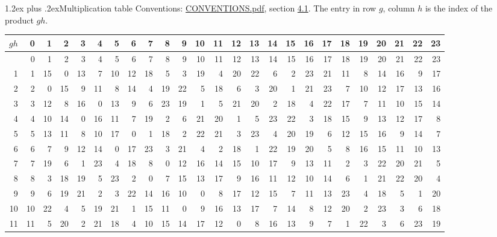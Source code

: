 \documentclass[10pt,a4paper]{article}
\makeatletter
\renewcommand\section{\@startsection{section}{1}{\z@}{-3ex plus -1ex minus -.2ex}%
  {1.2ex plus .2ex}{\normalfont\large\sffamily\bfseries\color{parttitle}}}
\numberwithin{equation}{section}
\makeatother
\begin{document}
\section{Multiplication table}\label{s:multiplication}
Conventions: \href{../../CONVENTIONS.pdf}{CONVENTIONS.pdf}, section \href{../../CONVENTIONS.pdf\#conv.4.1}{4.1}.
The entry in row $g$, column $h$ is the index of the product $gh$.
{\normalsize\setlength{\tabcolsep}{0.1em}\setlength{\LTleft}{-8pt plus 1fill}\setlength{\LTright}{-8pt plus 1fill}\begin{longtable}{@{}r|rrrrrrrrrrrrrrrrrrrrrrrr@{}}\toprule
$gh$ & 0 & 1 & 2 & 3 & 4 & 5 & 6 & 7 & 8 & 9 & 10 & 11 & 12 & 13 & 14 & 15 & 16 & 17 & 18 & 19 & 20 & 21 & 22 & 23\\\midrule\endhead
\bottomrule\endfoot\endlastfoot
0 & 0 & 1 & 2 & 3 & 4 & 5 & 6 & 7 & 8 & 9 & 10 & 11 & 12 & 13 & 14 & 15 & 16 & 17 & 18 & 19 & 20 & 21 & 22 & 23\\*
1 & 1 & 15 & 0 & 13 & 7 & 10 & 12 & 18 & 5 & 3 & 19 & 4 & 20 & 22 & 6 & 2 & 23 & 21 & 11 & 8 & 14 & 16 & 9 & 17\\
2 & 2 & 0 & 15 & 9 & 11 & 8 & 14 & 4 & 19 & 22 & 5 & 18 & 6 & 3 & 20 & 1 & 21 & 23 & 7 & 10 & 12 & 17 & 13 & 16\\
3 & 3 & 12 & 8 & 16 & 0 & 13 & 9 & 6 & 23 & 19 & 1 & 5 & 21 & 20 & 2 & 18 & 4 & 22 & 17 & 7 & 11 & 10 & 15 & 14\\
4 & 4 & 10 & 14 & 0 & 16 & 11 & 7 & 19 & 2 & 6 & 21 & 20 & 1 & 5 & 23 & 22 & 3 & 18 & 15 & 9 & 13 & 12 & 17 & 8\\
5 & 5 & 13 & 11 & 8 & 10 & 17 & 0 & 1 & 18 & 2 & 22 & 21 & 3 & 23 & 4 & 20 & 19 & 6 & 12 & 15 & 16 & 9 & 14 & 7\\
6 & 6 & 7 & 9 & 12 & 14 & 0 & 17 & 23 & 3 & 21 & 4 & 2 & 18 & 1 & 22 & 19 & 20 & 5 & 8 & 16 & 15 & 11 & 10 & 13\\
7 & 7 & 19 & 6 & 1 & 23 & 4 & 18 & 8 & 0 & 12 & 16 & 14 & 15 & 10 & 17 & 9 & 13 & 11 & 2 & 3 & 22 & 20 & 21 & 5\\
8 & 8 & 3 & 18 & 19 & 5 & 23 & 2 & 0 & 7 & 15 & 13 & 17 & 9 & 16 & 11 & 12 & 10 & 14 & 6 & 1 & 21 & 22 & 20 & 4\\
9 & 9 & 6 & 19 & 21 & 2 & 3 & 22 & 14 & 16 & 10 & 0 & 8 & 17 & 12 & 15 & 7 & 11 & 13 & 23 & 4 & 18 & 5 & 1 & 20\\
10 & 10 & 22 & 4 & 5 & 19 & 21 & 1 & 15 & 11 & 0 & 9 & 16 & 13 & 17 & 7 & 14 & 8 & 12 & 20 & 2 & 23 & 3 & 6 & 18\\
11 & 11 & 5 & 20 & 2 & 21 & 18 & 4 & 10 & 15 & 14 & 17 & 12 & 0 & 8 & 16 & 13 & 9 & 7 & 1 & 22 & 3 & 6 & 23 & 19\\

\end{longtable}}
\end{document}
